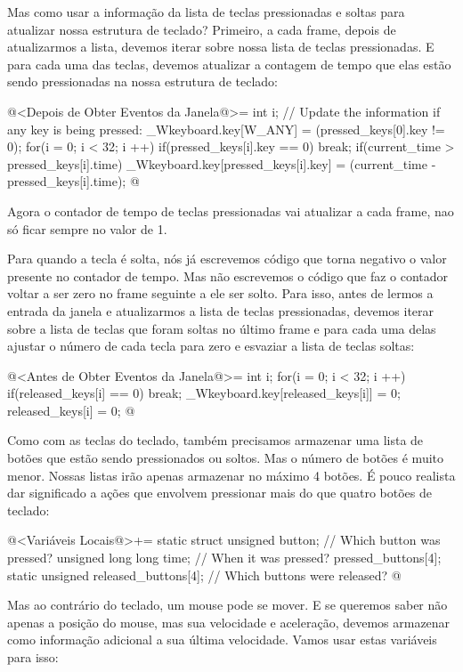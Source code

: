 Mas como usar a informação da lista de teclas pressionadas e soltas
para atualizar nossa estrutura de teclado? Primeiro, a cada frame,
depois de atualizarmos a lista, devemos iterar sobre nossa lista de
teclas pressionadas. E para cada uma das teclas, devemos atualizar a
contagem de tempo que elas estão sendo pressionadas na nossa estrutura
de teclado:

\iniciocodigo
@<Depois de Obter Eventos da Janela@>=
{
  int i;
  // Update the information if any key is being pressed:
  _Wkeyboard.key[W_ANY] = (pressed_keys[0].key != 0);
  for(i = 0; i < 32; i ++){
    if(pressed_keys[i].key == 0)
      break;
    if(current_time > pressed_keys[i].time)
      _Wkeyboard.key[pressed_keys[i].key] = (current_time - pressed_keys[i].time);
  }
}
@
\fimcodigo

Agora o contador de tempo de teclas pressionadas vai atualizar a cada
frame, nao só ficar sempre no valor de 1.

Para quando a tecla é solta, nós já escrevemos código que torna
negativo o valor presente no contador de tempo. Mas não escrevemos o
código que faz o contador voltar a ser zero no frame seguinte a ele
ser solto. Para isso, antes de lermos a entrada da janela e
atualizarmos a lista de teclas pressionadas, devemos iterar sobre a
lista de teclas que foram soltas no último frame e para cada uma
delas ajustar o número de cada tecla para zero e esvaziar a lista de
teclas soltas:

\iniciocodigo
@<Antes de Obter Eventos da Janela@>=
{
  int i;
  for(i = 0; i < 32; i ++){
    if(released_keys[i] == 0)
      break;
    _Wkeyboard.key[released_keys[i]] = 0;
    released_keys[i] = 0;
  }
}
@
\fimcodigo


Como com as teclas do teclado, também precisamos armazenar uma lista
de botões que estão sendo pressionados ou soltos. Mas o número de
botões é muito menor. Nossas listas irão apenas armazenar no máximo 4
botões. É pouco realista dar significado a ações que envolvem
pressionar mais do que quatro botões de teclado:

\iniciocodigo
@<Variáveis Locais@>+=
static struct{
  unsigned button; // Which button was pressed?
  unsigned long long time;       // When it was pressed?
} pressed_buttons[4];
static unsigned released_buttons[4]; // Which buttons were released?
@
\fimcodigo

Mas ao contrário do teclado, um mouse pode se mover. E se queremos
saber não apenas a posição do mouse, mas sua velocidade e aceleração,
devemos armazenar como informação adicional a sua última
velocidade. Vamos usar estas variáveis para isso:

